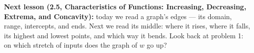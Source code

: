 \documentclass[10pt]{article}
\begin{document}
\vspace{0.06in}

\boxguard[8]
\begin{spiralbox}
\small
\textbf{Next lesson (2.5, Characteristics of Functions: Increasing, Decreasing, Extrema, and
Concavity):} today we read a graph's edges --- its domain, range, intercepts, and ends. Next we
read its middle: where it rises, where it falls, its highest and lowest points, and which way it
bends. Look back at problem 1: on which stretch of inputs does the graph of $w$ go up?
\end{spiralbox}
\end{document}
